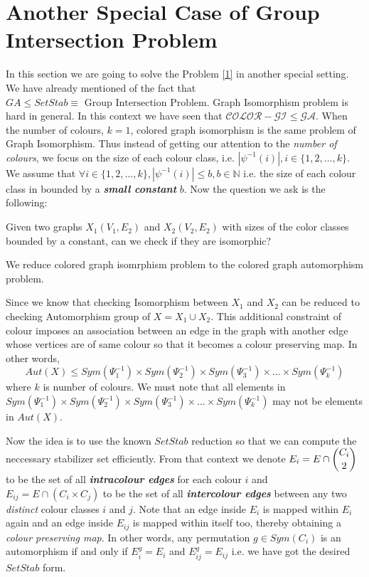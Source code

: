 \section{Another Special Case of Group Intersection Problem}
In this section we are going to solve the Problem \ref{1} in another special setting. We have already mentioned of the fact that $GA\leq SetStab\equiv\text{ Group Intersection Problem}$. Graph Isomorphism problem is hard in general. In this context we have seen that $\mathcal{COLOR-GI}\leq \mathcal{GA}$. When the number of colours, $k=1$, colored graph isomorphism is the same problem of Graph Isomorphism. Thus instead of getting our attention to the \emph{number of colours}, we focus on the size of each colour class, i.e. $|\psi^{-1}(i)|, i\in \{1,2,\ldots,k\}$. We assume that $\forall i\in\{1,2,\ldots,k\}, |\psi^{-1}(i)|\leq b, b\in \mathbb{N}$ i.e. the size of each colour class in bounded by a {\bf \emph{small constant}} $b$. Now the question we ask is the following:
\begin{problem}
	Given two graphs $X_1(V_1,E_2)$ and $X_2(V_2,E_2)$ with sizes of the color classes bounded by a constant, can we check if they are isomorphic?
\end{problem}

We reduce colored graph isomrphism problem to the colored graph automorphism problem.

Since we know that checking Isomorphism between $X_1$ and $X_2$ can be reduced to checking Automorphism group of $X = X_1 \cup X_2$. This additional constraint of colour imposes an association between an edge in the graph with another edge whose vertices are of same colour so that it becomes a colour preserving map. In other words,
\begin{equation*}
	Aut(X)\leq Sym(\Psi^{-1}_1) \times Sym(\Psi^{-1}_2) \times Sym(\Psi^{-1}_3) \times \ldots \times Sym(\Psi^{-1}_k)
\end{equation*}
where $k$ is number of colours. We must note that all elements in $Sym(\Psi^{-1}_1) \times Sym(\Psi^{-1}_2) \times Sym(\Psi^{-1}_3) \times \ldots \times Sym(\Psi^{-1}_k)$ may not be elements in $Aut(X)$. 


Now the idea is to use the known $SetStab$ reduction so that we can compute the neccessary stabilizer set efficiently. From that context we denote $E_i = E\cap \dbinom{C_i}{2}$ to be the set of all {\bf \emph{intracolour edges}} for each colour $i$ and $E_{ij} = E\cap (C_i\times C_j)$ to be the set of all {\bf \emph{intercolour edges}} between any two \emph{distinct} colour classes $i$ and $j$. Note that an edge inside $E_i$ is mapped within $E_i$ again and an edge inside $E_{ij}$ is mapped within itself too, thereby obtaining a \emph{colour preserving map}. In other words, any permutation $g \in Sym(C_i)$ is an automorphism if and only if $E_i^g = E_i$ and $E_{ij}^g = E_{ij}$ i.e. we have got the desired $SetStab$ form.


